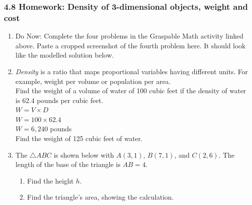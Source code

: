 

\fancyhead[LE]{\thepage}



\subsubsection*{4.8 Homework: Density of 3-dimensional objects, weight and cost}
\begin{enumerate}
\item Do Now: Complete the four problems in the Graspable Math activity linked above. Paste a cropped screenshot of the fourth problem here. It should look like the modelled solution below.

\item \emph{Density} is a ratio that maps proportional variables having different units. For example, weight per volume or population per area. \\[0.5cm]
Find the weight of a volume of water of 100 cubic feet if the density of water is 62.4 pounds per cubic feet.  \\[0.5cm]
$W=V \times D$\\
$W=100 \times 62.4$\\
$W=6,240$ pounds \\[0.5cm]
Find the weight of 125 cubic feet of water.

\item The $\triangle ABC$ is shown below with $A(3,1)$, $B(7,1)$, and $C(2,6)$. The length of the base of the triangle is $AB=4$.
  \begin{multicols}{2}
    \begin{enumerate}
      \item Find the height $h$.
      \item Find the triangle's area, showing the calculation. \vspace{2cm}
      \end{enumerate}
      \begin{flushright}
      \end{flushright}
  \end{multicols} 


\end{enumerate}

